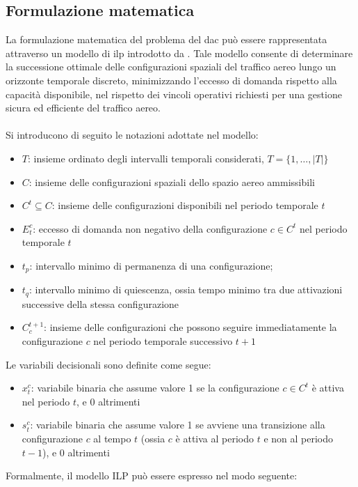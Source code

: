 \subsection{Formulazione matematica}
La formulazione matematica del problema del \gls{dac} può essere rappresentata attraverso un modello di \gls{ilp} introdotto da \citet{galeazzo2024integer}. Tale modello consente di determinare la successione ottimale delle configurazioni spaziali del traffico aereo lungo un orizzonte temporale discreto, minimizzando l'eccesso di domanda rispetto alla capacità disponibile, nel rispetto dei vincoli operativi richiesti per una gestione sicura ed efficiente del traffico aereo.\\\\
Si introducono di seguito le notazioni adottate nel modello:
\begin{itemize}
    \item $T$: insieme ordinato degli intervalli temporali considerati, $T = \{1, \dots, |T|\}$
    \item $C$: insieme delle configurazioni spaziali dello spazio aereo ammissibili
    \item $C^t \subseteq C$: insieme delle configurazioni disponibili nel periodo temporale $t$
    \item $E^c_t$: eccesso di domanda non negativo della configurazione $c \in C^t$ nel periodo temporale $t$
    \item $t_p$: intervallo minimo di permanenza di una configurazione;
    \item $t_q$: intervallo minimo di quiescenza, ossia tempo minimo tra due attivazioni successive della stessa configurazione
    \item $C_{c}^{t+1}$: insieme delle configurazioni che possono seguire immediatamente la configurazione $c$ nel periodo temporale successivo $t+1$
\end{itemize}
    Le variabili decisionali sono definite come segue:
    \begin{itemize}
        \item $x^c_t$: variabile binaria che assume valore 1 se la configurazione $c \in C^t$ è attiva nel periodo $t$, e 0 altrimenti
        \item $s^c_t$: variabile binaria che assume valore 1 se avviene una transizione alla configurazione $c$ al tempo $t$ (ossia $c$ è attiva al periodo $t$ e non al periodo $t-1$), e 0 altrimenti
    \end{itemize}
    Formalmente, il modello ILP può essere espresso nel modo seguente:
